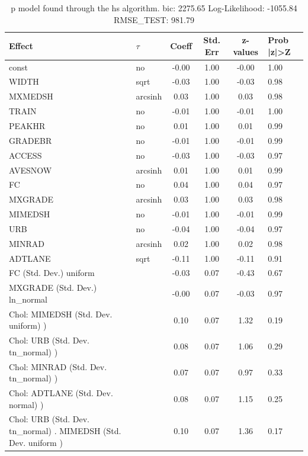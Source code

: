 \begin{table}
	\caption{p model found through the hs algorithm. bic: 2275.65 Log-Likelihood: -1055.84 RMSE_TEST: 981.79}
	\begin{center}
		\begin{tabular}{|l|l|c|c|c|l|}
			\hline
			Effect & $\tau$ & Coeff & Std. Err & z-values & Prob |z|>Z \\
			\hline
			const & no & -0.00 & 1.00 & -0.00 & 1.00 \\
			\hline
			WIDTH & sqrt & -0.03 & 1.00 & -0.03 & 0.98 \\
			\hline
			MXMEDSH & arcsinh & 0.03 & 1.00 & 0.03 & 0.98 \\
			\hline
			TRAIN & no & -0.01 & 1.00 & -0.01 & 1.00 \\
			\hline
			PEAKHR & no & 0.01 & 1.00 & 0.01 & 0.99 \\
			\hline
			GRADEBR & no & -0.01 & 1.00 & -0.01 & 0.99 \\
			\hline
			ACCESS & no & -0.03 & 1.00 & -0.03 & 0.97 \\
			\hline
			AVESNOW & arcsinh & 0.01 & 1.00 & 0.01 & 0.99 \\
			\hline
			FC & no & 0.04 & 1.00 & 0.04 & 0.97 \\
			\hline
			MXGRADE & arcsinh & 0.03 & 1.00 & 0.03 & 0.98 \\
			\hline
			MIMEDSH & no & -0.01 & 1.00 & -0.01 & 0.99 \\
			\hline
			URB & no & -0.04 & 1.00 & -0.04 & 0.97 \\
			\hline
			MINRAD & arcsinh & 0.02 & 1.00 & 0.02 & 0.98 \\
			\hline
			ADTLANE & sqrt & -0.11 & 1.00 & -0.11 & 0.91 \\
			\hline
			FC (Std. Dev.) uniform &  & -0.03 & 0.07 & -0.43 & 0.67 \\
			\hline
			MXGRADE (Std. Dev.) ln_normal &  & -0.00 & 0.07 & -0.03 & 0.97 \\
			\hline
			 Chol: MIMEDSH (Std. Dev. uniform) ) &  & 0.10 & 0.07 & 1.32 & 0.19 \\
			\hline
			 Chol: URB (Std. Dev. tn_normal) ) &  & 0.08 & 0.07 & 1.06 & 0.29 \\
			\hline
			 Chol: MINRAD (Std. Dev. tn_normal) ) &  & 0.07 & 0.07 & 0.97 & 0.33 \\
			\hline
			 Chol: ADTLANE (Std. Dev. normal) ) &  & 0.08 & 0.07 & 1.15 & 0.25 \\
			\hline
			 Chol: URB (Std. Dev. tn_normal) . MIMEDSH (Std. Dev.   uniform ) &  & 0.10 & 0.07 & 1.36 & 0.17 \\

\end{tabular}
\end{center}
\end{table}
